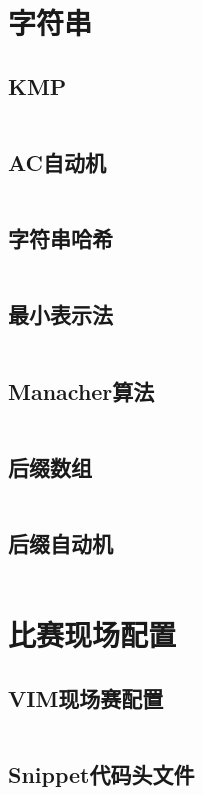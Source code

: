 \documentclass[a4paper,12pt]{article}
\begin{document}
\newpage
\section{字符串}
\subsection{KMP}
\inputminted[breaklines, linenos]{c++}{string/kmp.cc}
\subsection{AC自动机}
\inputminted[breaklines, linenos]{c++}{string/ac_auto.cc}
\subsection{字符串哈希}
\inputminted[breaklines, linenos]{c++}{string/hash.cc}
\subsection{最小表示法}
\inputminted[breaklines, linenos]{c++}{string/minimal.cc}
\subsection{Manacher算法}
\inputminted[breaklines, linenos]{c++}{string/manacher.cc}
\subsection{后缀数组}
\inputminted[breaklines, linenos]{c++}{string/sa.cc}
\subsection{后缀自动机}
\inputminted[breaklines, linenos]{c++}{string/sam.cc}


\newpage
\section{比赛现场配置}
\subsection{VIM现场赛配置}
\inputminted[breaklines, linenos]{bash}{others/vim.bash}
\subsection{Snippet代码头文件}
\inputminted[breaklines, linenos]{c++}{others/head.cc}
\end{document}

